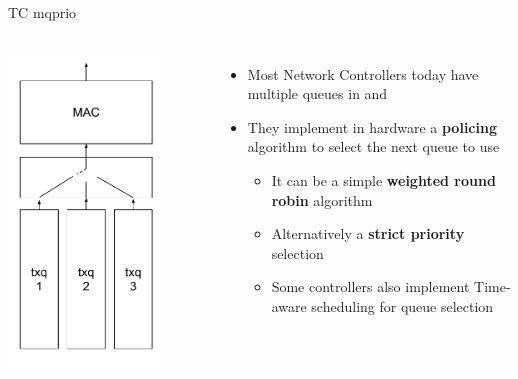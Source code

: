 \begin{frame}{TC mqprio}
	\begin{columns}
		\includegraphics[width=0.8\textwidth]{slides/networking-traffic-control/txq_mq.pdf}
	\begin{itemize}
		\item Most Network Controllers today have multiple queues in  and 
		\item They implement in hardware a \textbf{policing} algorithm to select the next  queue to use
			\begin{itemize}
				\item It can be a simple \textbf{weighted round robin} algorithm
				\item Alternatively a \textbf{strict priority} selection
				\item Some controllers also implement Time-aware scheduling for queue selection
			\end{itemize}
	\end{itemize}
	\end{columns}
\end{frame}

